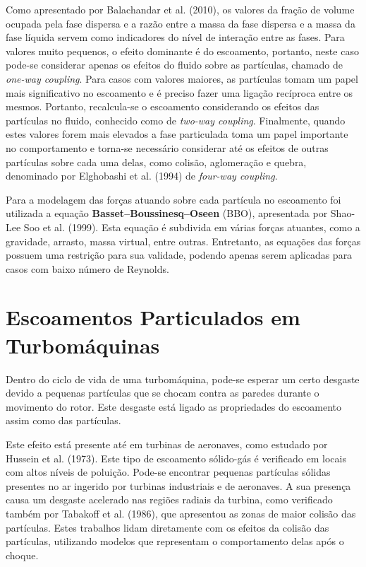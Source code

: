 Como apresentado por Balachandar et al. (2010)\cite{Balachandar-2010}, os valores da fração de volume ocupada pela fase dispersa e a razão entre a massa da fase dispersa e a massa da fase líquida servem como indicadores do nível de interação entre as fases.
Para valores muito pequenos, o efeito dominante é do escoamento, portanto, neste caso pode-se considerar apenas os efeitos do fluido sobre as partículas, chamado de \textit{one-way coupling}.
Para casos com valores maiores, as partículas tomam um papel mais significativo no escoamento e é preciso fazer uma ligação recíproca entre os mesmos.
Portanto, recalcula-se o escoamento considerando os efeitos das partículas no fluido, conhecido como de \textit{two-way coupling}.
Finalmente, quando estes valores forem mais elevados a fase particulada toma um papel importante no comportamento e torna-se necessário considerar até os efeitos de outras partículas sobre cada uma delas, como colisão, aglomeração e quebra, denominado por Elghobashi et al. (1994)\cite{Elghobashi-1994} de \textit{four-way coupling}.

Para a modelagem das forças atuando sobre cada partícula no escoamento foi utilizada a equação \textbf{Basset–Boussinesq–Oseen} (BBO), apresentada por Shao-Lee Soo et al. (1999)\cite{ShaoLeeSoo-1999}.
Esta equação é subdivida em várias forças atuantes, como a gravidade, arrasto, massa virtual, entre outras.
Entretanto, as equações das forças possuem uma restrição para sua validade, podendo apenas serem aplicadas para casos com baixo número de Reynolds.


\section{\textbf{Escoamentos Particulados em Turbomáquinas}}
\label{sec_rev_EP}
Dentro do ciclo de vida de uma turbomáquina, pode-se esperar um certo desgaste devido a pequenas partículas que se chocam contra as paredes durante o movimento do rotor.
Este desgaste está ligado as propriedades do escoamento assim como das partículas.

Este efeito está presente até em turbinas de aeronaves, como estudado por Hussein et al. (1973)\cite{Hussein-1973}.
Este tipo de escoamento sólido-gás é verificado em locais com altos níveis de poluição.
Pode-se encontrar pequenas partículas sólidas presentes no ar ingerido por turbinas industriais e de aeronaves.
A sua presença causa um desgaste acelerado nas regiões radiais da turbina, como verificado também por Tabakoff et al. (1986)\cite{Tabakoff-1986}, que apresentou as zonas de maior colisão das partículas.
Estes trabalhos lidam diretamente com os efeitos da colisão das partículas, utilizando modelos que representam o comportamento delas após o choque.

